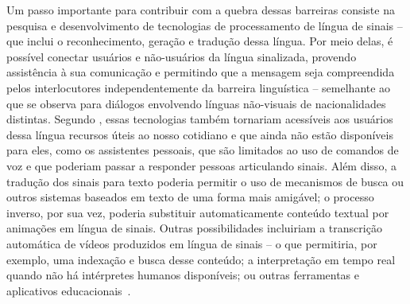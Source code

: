 
Um passo importante para contribuir com a quebra dessas barreiras consiste na pesquisa e desenvolvimento de tecnologias de processamento de língua de sinais -- que inclui o reconhecimento, geração e tradução dessa língua. 
Por meio delas, é possível conectar usuários e não-usuários da língua sinalizada, provendo assistência à sua comunicação e permitindo que a mensagem seja compreendida pelos interlocutores independentemente da barreira linguística -- semelhante ao que se observa para diálogos envolvendo línguas não-visuais de nacionalidades distintas.
Segundo \citeauthor{bragg-2019-slr-interdisciplinary}, essas tecnologias também tornariam acessíveis aos usuários dessa língua recursos úteis ao nosso cotidiano e que ainda não estão disponíveis para eles, como os assistentes pessoais, que são limitados ao uso de comandos de voz e que poderiam passar a responder pessoas articulando sinais. Além disso, a tradução dos sinais para texto poderia permitir o uso de mecanismos de busca ou outros sistemas baseados em texto de uma forma mais amigável; o processo inverso, por sua vez, poderia substituir automaticamente conteúdo textual por animações em língua de sinais. Outras possibilidades incluiriam a transcrição automática de vídeos produzidos em língua de sinais -- o que permitiria, por exemplo, uma indexação e busca desse conteúdo; a interpretação em tempo real quando não há intérpretes humanos disponíveis; ou outras ferramentas e aplicativos educacionais~\cite{bragg-2019-slr-interdisciplinary}.


